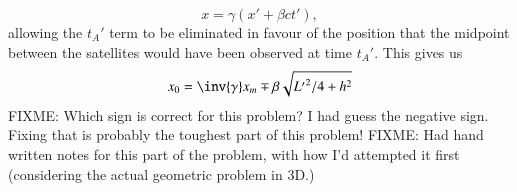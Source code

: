 {%
\begin{equation}\label{eqn:relElectroDynProblemSet1:1460}
x = \gamma ( x' + \beta c t'),
\end{equation}
%
allowing the \(t_A'\) term to be eliminated in favour of the position that the midpoint between the satellites would have been observed at time \(t_A'\).  This gives us
%
\begin{equation}\label{eqn:relElectroDynProblemSet1:1480}
x_0 = \inv{\gamma} x_m \mp \beta \sqrt{{L'}^2/4 + h^2}
\end{equation}
%
FIXME: Which sign is correct for this problem?  I had guess the negative sign.  Fixing that is probably the toughest part of this problem!
%
%
FIXME: Had hand written notes for this part of the problem, with how I'd attempted it first (considering the actual geometric problem in 3D.)

} %

